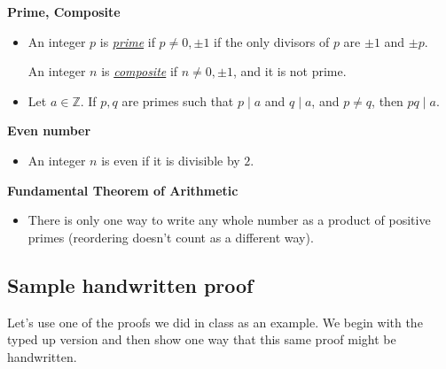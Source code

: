 \documentclass[11pt]{article}
\newcommand{\Z}{\mathbb{Z}}
\newcommand\divides{\;|\;}
\theoremstyle{definition}
\begin{document}
{\bf Prime, Composite} 
\vspace*{-6pt}
\begin{itemize} 
\item An integer $p$ is \underline{{\it prime}} if $p\neq 0, \pm1 $ if the only divisors of $p$ are $\pm 1$ and $\pm p$. 

An integer $n$ is \underline{\it composite} if $n\neq 0, \pm 1$, and it is not prime.

\item Let $a\in \Z$. If $p,q$ are primes such that $p\divides a$ and $q\divides a$, and $p\neq q$, then $pq\divides a$.
\end{itemize}

{\bf Even number}
\vspace*{-6pt}
\begin{itemize} 
\item[] An integer $n$ is even if it is divisible by $2$.
\end{itemize}

{\bf Fundamental Theorem of Arithmetic} 
\vspace*{-6pt}
\begin{itemize}\item[] There is only one way to write any whole number as a product of positive primes (reordering doesn't count as a different way).
\end{itemize}



\newpage
\subsection{Sample handwritten proof}

Let's use one of the proofs we did in class as an example.  We begin with the typed up version and then show one way that this same proof might be handwritten.
\end{document}
